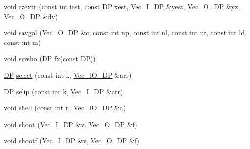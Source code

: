 \begin{DoxyCompactItemize}
\item 
void \mbox{\hyperlink{namespaceNR_a17af9084521630603977a8c9bd46bd40}{rzextr}} (const int iest, const \mbox{\hyperlink{namespaceNR_af6ff762dd605ff477b8e52387253a02a}{DP}} xest, \mbox{\hyperlink{namespaceNR_a9f943da53862537c552e2a770cb170ae}{Vec\+\_\+\+I\+\_\+\+DP}} \&yest, \mbox{\hyperlink{namespaceNR_a970094d23441f8ef6a45282a7eb2103d}{Vec\+\_\+\+O\+\_\+\+DP}} \&yz, \mbox{\hyperlink{namespaceNR_a970094d23441f8ef6a45282a7eb2103d}{Vec\+\_\+\+O\+\_\+\+DP}} \&dy)
\item 
void \mbox{\hyperlink{namespaceNR_a8c8d71cc60561155b11e42e028ee3b8c}{savgol}} (\mbox{\hyperlink{namespaceNR_a970094d23441f8ef6a45282a7eb2103d}{Vec\+\_\+\+O\+\_\+\+DP}} \&c, const int np, const int nl, const int nr, const int ld, const int m)
\item 
void \mbox{\hyperlink{namespaceNR_adc488f409f614650e59bd201350349ee}{scrsho}} (\mbox{\hyperlink{namespaceNR_af6ff762dd605ff477b8e52387253a02a}{DP}} fx(const \mbox{\hyperlink{namespaceNR_af6ff762dd605ff477b8e52387253a02a}{DP}}))
\item 
\mbox{\hyperlink{namespaceNR_af6ff762dd605ff477b8e52387253a02a}{DP}} \mbox{\hyperlink{namespaceNR_a0717290c06f42aa15e83108843ebe8e9}{select}} (const int k, \mbox{\hyperlink{namespaceNR_ab293e06a6bf799d8a7ed932b6852bcb8}{Vec\+\_\+\+I\+O\+\_\+\+DP}} \&arr)
\item 
\mbox{\hyperlink{namespaceNR_af6ff762dd605ff477b8e52387253a02a}{DP}} \mbox{\hyperlink{namespaceNR_a9c893dc4317a41c90e5275f875f49514}{selip}} (const int k, \mbox{\hyperlink{namespaceNR_a9f943da53862537c552e2a770cb170ae}{Vec\+\_\+\+I\+\_\+\+DP}} \&arr)
\item 
void \mbox{\hyperlink{namespaceNR_a64047fe43a54a8a00d0311739cf7d0d2}{shell}} (const int n, \mbox{\hyperlink{namespaceNR_ab293e06a6bf799d8a7ed932b6852bcb8}{Vec\+\_\+\+I\+O\+\_\+\+DP}} \&a)
\item 
void \mbox{\hyperlink{namespaceNR_a3a4867f05151e5dd8b231be47dbd5523}{shoot}} (\mbox{\hyperlink{namespaceNR_a9f943da53862537c552e2a770cb170ae}{Vec\+\_\+\+I\+\_\+\+DP}} \&\mbox{\hyperlink{hadron__timeslice_8cc_a716fc87f5e814be3ceee2405ed6ff22a}{v}}, \mbox{\hyperlink{namespaceNR_a970094d23441f8ef6a45282a7eb2103d}{Vec\+\_\+\+O\+\_\+\+DP}} \&f)
\item 
void \mbox{\hyperlink{namespaceNR_a377b3f789f3b63d3472b288e5ee103cd}{shootf}} (\mbox{\hyperlink{namespaceNR_a9f943da53862537c552e2a770cb170ae}{Vec\+\_\+\+I\+\_\+\+DP}} \&\mbox{\hyperlink{hadron__timeslice_8cc_a716fc87f5e814be3ceee2405ed6ff22a}{v}}, \mbox{\hyperlink{namespaceNR_a970094d23441f8ef6a45282a7eb2103d}{Vec\+\_\+\+O\+\_\+\+DP}} \&f)

\end{DoxyCompactItemize}

